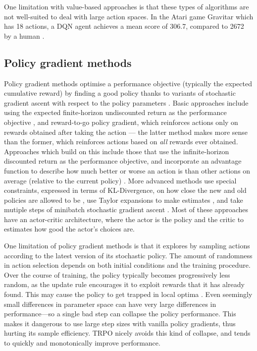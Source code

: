 \documentclass[12pt,a4paper]{article}
\begin{document}
One limitation with value-based approaches is that these types of algorithms are not well-suited to deal with large action spaces. In the Atari game Gravitar which has 18 actions, a DQN agent achieves a mean score of 306.7, compared to 2672 by a human \cite{Mnih2015}. 

\subsection{Policy gradient methods}
Policy gradient methods optimise a performance objective (typically the expected cumulative reward) by finding a good policy thanks to variants of stochastic gradient ascent with respect to the policy parameters \cite{DBLP:journals/corr/abs-1811-12560}. Basic approaches include using the expected finite-horizon undiscounted return as the performance objective \cite{}, and reward-to-go policy gradient, which reinforces actions only on rewards obtained after taking the action \cite{} --- the latter method makes more sense than the former, which reinforces actions based on \textit{all} rewards ever obtained. Approaches which build on this include those that use the infinite-horizon discounted return as the performance objective, and incorporate an advantage function to describe how much better or worse an action is than other actions on average (relative to the current policy) \cite{}. More advanced methods use special constraints, expressed in terms of KL-Divergence, on how close the new and old policies are allowed to be \cite{DBLP:journals/corr/SchulmanLMJA15}, use Taylor expansions to make estimates \cite{DBLP:journals/corr/SchulmanLMJA15}, and take mutiple steps of minibatch stochastic gradient ascent \cite{DBLP:journals/corr/SchulmanWDRK17}. Most of these approaches have an actor-critic architecture, where the actor is the policy and the critic to estimates how good the actor's choices are.

One limitation of policy gradient methods is that it explores by sampling actions according to the latest version of its stochastic policy. The amount of randomness in action selection depends on both initial conditions and the training procedure. Over the course of training, the policy typically becomes progressively less random, as the update rule encourages it to exploit rewards that it has already found. This may cause the policy to get trapped in local optima \cite{}. Even seemingly small differences in parameter space can have very large differences in performance—so a single bad step can collapse the policy performance. This makes it dangerous to use large step sizes with vanilla policy gradients, thus hurting its sample efficiency. TRPO nicely avoids this kind of collapse, and tends to quickly and monotonically improve performance.
\end{document}
